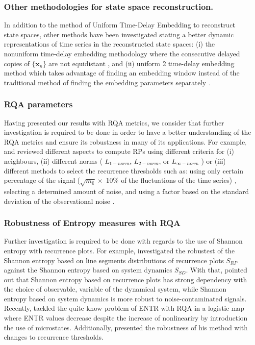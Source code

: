 \subsubsection*{Other methodologies for state space reconstruction.}
In addition to the method of Uniform Time-Delay Embedding to reconstruct
state spaces, other methods have been investigated stating a better 
dynamic representations of time series in the reconstructed state spaces:
(i) the nonuniform time-delay embedding methodology  
where the consecutive delayed copies of $\{ \boldsymbol{x}_n  \} $ are not
equidistant
\citep{pecora2007, uzal2011, 
Quintana-Duque2012, Quintana-Duque2013, Quintana-Duque2016}, and
(ii) uniform 2 time-delay embedding method which takes advantage 
of finding an embedding window instead of the traditional method 
of finding the embedding parameters separately \citep{gomezgarcia2014}.


\subsubsection*{RQA parameters}
Having presented our results with RQA metrics, we consider that further 
investigation is required to be done in order to have a better 
understanding of the RQA metrics and ensure its robustness in many of 
its applications. 
For example, \cite{marwan2007} and 
\cite{marwan2015} reviewed different aspects to 
compute RPs using different criteria for (i) neighbours, 
(ii) different norms ( $L_{1-norm}$, $L_{2-norm}$, or $L_{\infty-norm}$ ) or 
(iii) different methods to select the recurrence thresholds such as: 
using only certain percentage of the signal
($\sqrt{m_0} \times$ 10\% of the fluctuations of the time series)
\citep{letellier2006}, selecting a determined amount of noise, and 
using a factor based on the standard deviation of the 
observational noise \cite{marwan2007}.



\subsubsection*{Robustness of Entropy measures with RQA}
Further investigation is required to be done with regards to
the use of Shannon entropy with recurrence plots.
For example, \cite{letellier2006} investigated the robustest of 
the Shannon entropy based on line segments distributions of 
recurrence plots $S_{RP}$ 
against the Shannon entropy based on system dynamics $S_{SD}$.
With that, \cite{letellier2006} pointed out that Shannon entropy based on 
recurrence plots has strong dependency with the choice of observable,
variable of the dynamical system, while Shannon entropy based on system dynamics 
is more robust to noise-contaminated signals.
Recently, \cite{corso2017} tackled the quite know problem of ENTR with RQA
in a logistic map \citep{marwan2007} where ENTR values decrease despite the 
increase of nonlineariry by introduction the use of microstates. 
Additionally, \cite{corso2017} presented the robustness of his method 
with changes to recurrence thresholds.


